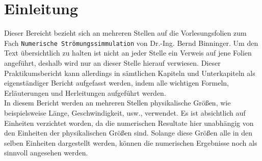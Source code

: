\chapter{Einleitung}
Dieser Bereicht bezieht sich an mehreren Stellen auf die Vorlesungsfolien zum Fach \texttt{Numerische Str\"omungssimmulation} von Dr.-Ing. Bernd Binninger. Um den Text \"ubersichtlich zu halten ist nicht an jeder Stelle ein Verweis auf jene Folien angef\"uhrt, deshalb wird nur an dieser Stelle hierauf verwiesen. Dieser Praktikumsbericht kann allerdings in s\"amtlichen Kapiteln und Unterkapiteln als eigenst\"andiger Bericht aufgefasst werden, indem alle wichtigen Formeln, Erl\"auterungen und Herleitungen aufgef\"uhrt werden. \\[0.5cm]
In diesem Bericht werden an mehreren Stellen physikalische Gr\"o\ss{}en, wie beispielsweise L\"ange, Geschwindigkeit, usw., verwendet. Es ist absichtlich auf Einheiten verzichtet worden, da die numerischen Resultate hier unabh\"angig von den Einheiten der physikalischen Gr\"o\ss{}en sind. Solange diese Gr\"o\ss{}en alle in den selben Einheiten dargestellt werden, k\"onnen die numerischen Ergebnisse noch als sinnvoll angesehen werden.